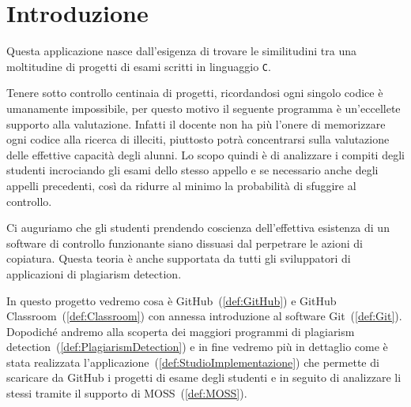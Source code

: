 
\chapter*{Introduzione}

	Questa applicazione nasce dall'esigenza di trovare le similitudini tra una moltitudine di progetti di esami scritti in linguaggio \verb|C|. 
	
	Tenere sotto controllo centinaia di progetti, ricordandosi ogni singolo codice è umanamente impossibile, per questo motivo il seguente programma è un'eccellete supporto alla valutazione. Infatti il docente non ha più l'onere di memorizzare ogni codice alla ricerca di illeciti, piuttosto potrà concentrarsi sulla valutazione delle effettive capacità degli alunni.
	Lo scopo quindi è di analizzare i compiti degli studenti incrociando gli esami dello stesso appello e se necessario anche degli appelli precedenti, così da ridurre al minimo la probabilità di sfuggire al controllo.
	
	Ci auguriamo che gli studenti prendendo coscienza dell'effettiva esistenza di un software di controllo funzionante siano dissuasi dal perpetrare le azioni di copiatura. Questa teoria è anche supportata da tutti gli sviluppatori di applicazioni di plagiarism detection. 
	
	In questo progetto vedremo cosa è GitHub~(\ref{def:GitHub}) e GitHub Classroom~(\ref{def:Classroom}) con annessa introduzione al software Git~(\ref{def:Git}). Dopodiché andremo alla scoperta dei maggiori programmi di plagiarism detection~(\ref{def:PlagiarismDetection}) e in fine vedremo più in dettaglio come è stata realizzata l'applicazione~(\ref{def:StudioImplementazione}) che permette di scaricare da GitHub i progetti di esame degli studenti e in seguito di analizzare li stessi tramite il supporto di MOSS~(\ref{def:MOSS}).
